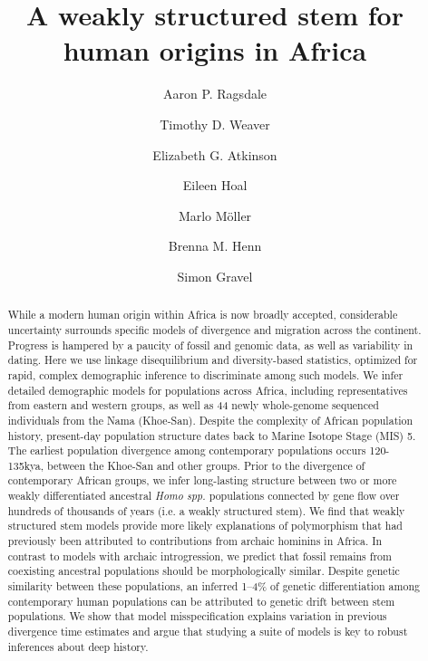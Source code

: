 \documentclass[]{article}
\begin{document}
\title{A weakly structured stem for human origins in Africa}
\author[1]{Aaron P. Ragsdale}
\author[2]{Timothy D. Weaver}
\author[3]{Elizabeth G. Atkinson}
\author[4]{Eileen Hoal}
\author[4]{Marlo M\"{o}ller}
\author[2,6,$\dag$,*]{Brenna M. Henn}
\author[7,$\dag$,**]{Simon Gravel}
\maketitle

\begin{abstract}
While a modern human origin within Africa is now broadly accepted, considerable
uncertainty surrounds specific models of divergence and migration across the
continent. Progress is hampered by a paucity of fossil and genomic data, as
well as variability in dating. Here we use linkage disequilibrium and
diversity-based statistics, optimized for rapid, complex demographic inference
to discriminate among such models. We infer detailed demographic models for
populations across Africa, including representatives from eastern and western
groups, as well as 44 newly whole-genome sequenced individuals from the Nama
(Khoe-San). Despite the complexity of African population history, present-day
population structure dates back to Marine Isotope Stage (MIS) 5. The earliest
population divergence among contemporary populations occurs 120-135kya, between
the Khoe-San and other groups. Prior to the divergence of contemporary African
groups, we infer long-lasting structure between two or more weakly
differentiated ancestral \emph{Homo spp.} populations connected by gene flow over
hundreds of thousands of years (i.e. a weakly structured stem). We find that
weakly structured stem models provide more likely explanations of polymorphism
that had previously been attributed to contributions from archaic hominins in
Africa.
In contrast to models with archaic introgression, we predict that fossil
remains from coexisting ancestral populations should be morphologically
similar.
Despite genetic similarity between these populations, an inferred 1--4\%
of genetic differentiation among contemporary human populations can be
attributed to genetic drift between stem populations.
We show that model misspecification explains variation in previous
divergence time estimates and argue that studying a suite of models is key to
robust inferences about deep history.
\end{abstract}
\end{document}

